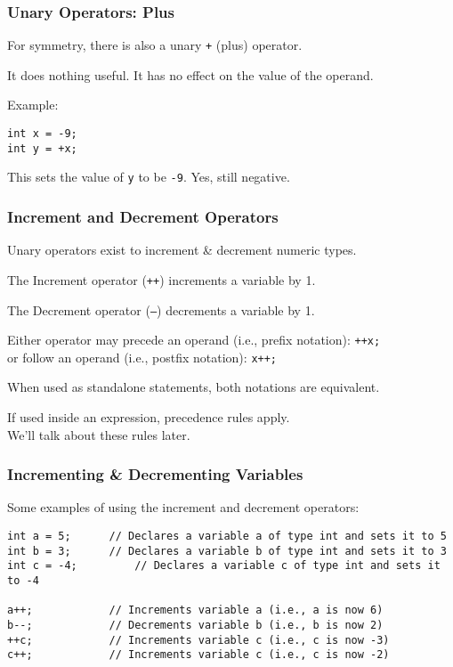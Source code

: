 \begin{frame}[fragile]
\frametitle{Unary Operators: Plus}
For symmetry, there is also a unary \texttt{+} (plus) operator.

It does nothing useful. It has no effect on the value of the operand.

Example:
\vspace{-2em}
\begin{verbatim}
int x = -9;
int y = +x;
\end{verbatim}

This sets the value of \texttt{y} to be \texttt{-9}. Yes, still negative.

\end{frame}

\begin{frame}
\frametitle{Increment and Decrement Operators}

Unary operators exist to increment \& decrement numeric types.

The Increment operator (\texttt{++}) increments a variable by 1.

The Decrement operator (\texttt{--}) decrements a variable by 1.

Either operator may precede an operand (i.e., prefix notation): \texttt{++x;}\\
or follow an operand (i.e., postfix notation): \texttt{x++;}

When used as standalone statements, both notations are equivalent.

If used inside an expression, precedence rules apply.\\
\quad We'll talk about these rules later.

\end{frame}

\begin{frame}[fragile]
\frametitle{Incrementing \& Decrementing Variables}

Some examples of using the increment and decrement operators:

{\scriptsize
\begin{verbatim}
int a = 5;		// Declares a variable a of type int and sets it to 5
int b = 3;		// Declares a variable b of type int and sets it to 3
int c = -4; 		// Declares a variable c of type int and sets it to -4
	
a++;			// Increments variable a (i.e., a is now 6)
b--;			// Decrements variable b (i.e., b is now 2)
++c;			// Increments variable c (i.e., c is now -3)
c++;			// Increments variable c (i.e., c is now -2) 
\end{verbatim}
}

\end{frame}



